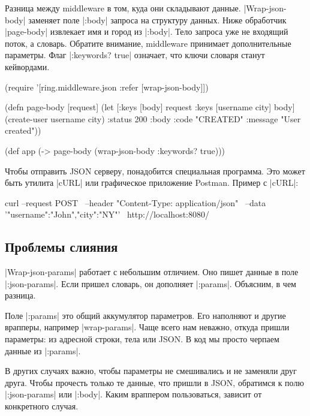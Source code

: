 Разница между middleware в том, куда они складывают
данные. \spverb|Wrap-json-body| заменяет поле \spverb|:body| запроса на
структуру данных. Ниже обработчик \spverb|page-body| извлекает имя и город из
\spverb|:body|. Тело запроса уже не входящий поток, а словарь. Обратите
внимание, middleware принимает дополнительные параметры. Флаг \spverb|:keywords? true|
означает, что ключи словаря станут кейвордами.

\begin{english}
  \begin{clojure}
(require '[ring.middleware.json :refer [wrap-json-body]])

(defn page-body [request]
  (let [{:keys [body]} request
        {:keys [username city]} body]
    (create-user username city)
    {:status 200
     :body {:code "CREATED"
            :message "User created"}}))

(def app (-> page-body
             (wrap-json-body {:keywords? true})))
  \end{clojure}
\end{english}

Чтобы отправить JSON серверу, понадобится специальная программа. Это может быть
утилита \spverb|cURL| или графическое приложение
Postman. Пример с \spverb|cURL|:

\begin{english}
  \begin{bash}
curl --request POST \
     --header "Content-Type: application/json" \
     --data '{"username":"John","city":"NY"}' \
     http://localhost:8080/
  \end{bash}
\end{english}

\subsection{Проблемы слияния}

\spverb|Wrap-json-params| работает с небольшим отличием. Оно пишет данные в поле
\spverb|:json-params|. Если пришел словарь, он дополняет
\spverb|:params|. Объясним, в чем разница.

Поле \spverb|:params| это общий аккумулятор параметров. Его наполняют и другие
врапперы, например \spverb|wrap-params|. Чаще всего нам неважно, откуда пришли
параметры: из адресной строки, тела или JSON. В код мы просто черпаем данные из
\spverb|:params|.

В других случаях важно, чтобы параметры не смешивались и не заменяли друг
друга. Чтобы прочесть только те данные, что пришли в JSON, обратимся к полю
\spverb|:json-params| или \spverb|:body|. Каким враппером пользоваться, зависит
от конкретного случая.


